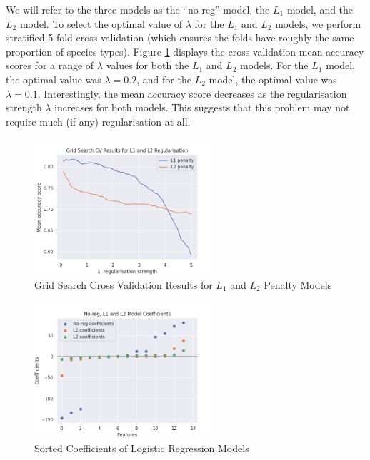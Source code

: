 We will refer to the three models as the ``no-reg'' model, the $L_1$ model, and the $L_2$ model. To select the optimal value of $\lambda$ for the $L_1$ and $L_2$ models, we perform stratified 5-fold cross validation (which ensures the folds have roughly the same proportion of species types). Figure \ref{logreggridsearchcv} displays the cross validation mean accuracy scores for a range of $\lambda$ values for both the $L_1$ and $L_2$ models. For the $L_1$ model, the optimal value was $\lambda = 0.2$, and for the $L_2$ model, the optimal value was $\lambda = 0.1$. Interestingly, the mean accuracy score decreases as the regularisation strength $\lambda$ increases for both models. This suggests that this problem may not require much (if any) regularisation at all.

\begin{figure}[!ht]
\begin{center}
\includegraphics[width=0.6\textwidth]{fig/grid_search_cv_l1_l2_logreg.png}
\end{center}
\caption{Grid Search Cross Validation Results for $L_1$ and $L_2$ Penalty Models}
\label{logreggridsearchcv}
\end{figure}

\begin{figure}[!ht]
\begin{center}
\includegraphics[width=0.6\textwidth]{fig/coef_logreg.png}
\end{center}
\caption{Sorted Coefficients of Logistic Regression Models}
\label{logregcoef}
\end{figure}

